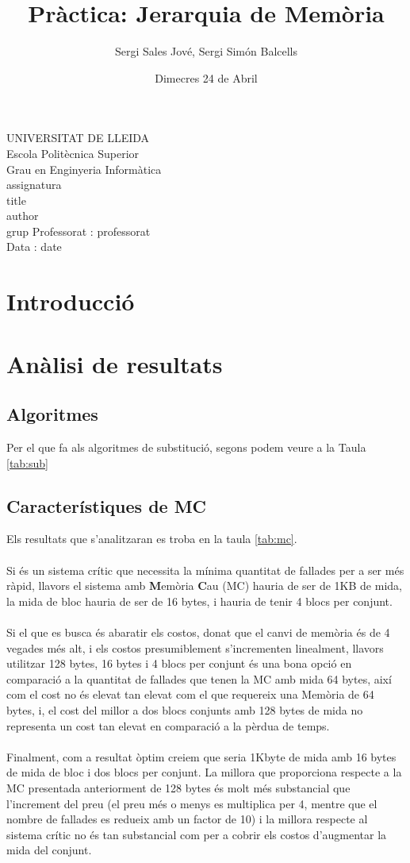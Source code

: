 \documentclass{article}
\title{Pràctica: Jerarquia de Memòria}
\author{Sergi Sales Jové, Sergi Simón Balcells}
\date{Dimecres 24 de Abril}
\renewcommand{\maketitle}{ %
    \begin{titlepage}
        \raggedright{UNIVERSITAT DE LLEIDA \\
            Escola Politècnica Superior \\
            Grau en Enginyeria Informàtica\\
            \1assignatura\\}
            \vspace{5cm}
            \centering\huge{\5title \\}
            \vspace{3cm}
            \large{\6author} \\
            \normalsize{\3grup}
            \vfill
            Professorat : \4professorat \\
            Data : \7date
\end{titlepage}}
\begin{document}
\maketitle
\thispagestyle{empty}

\newpage
{}
\tableofcontents
\newpage
{}
\section{Introducció}
\section{Anàlisi de resultats}
\subsection{Algoritmes}
Per el que fa als algoritmes de substitució, segons podem veure a la Taula \ref{tab:sub}


\subsection{Característiques de MC}
Els resultats que s'analitzaran es troba en la taula \ref{tab:mc}.\\
\\
Si és un sistema crític que necessita la mínima quantitat de fallades per a ser més
ràpid, llavors el sistema amb \textbf{M}emòria \textbf{C}au (MC) hauria de ser de 1KB
de mida, la mida de bloc hauria de ser de 16 bytes, i hauria de tenir 4 blocs per conjunt.\\
\\
Si el que es busca és abaratir els costos, donat que el canvi de memòria és de 4 vegades més
alt, i els costos presumiblement s'incrementen linealment, llavors utilitzar 128 bytes, 16 bytes i
4 blocs per conjunt és una bona opció en comparació a la quantitat de fallades que tenen la MC amb
mida 64 bytes, així com el cost no és elevat tan elevat com el que requereix una Memòria de 64 bytes,
i, el cost del millor a dos blocs conjunts amb 128 bytes de mida no representa un cost tan elevat
en comparació a la pèrdua de temps.\\
\\
Finalment, com a resultat òptim creiem que seria 1Kbyte de mida amb 16 bytes de mida de bloc i
dos blocs per conjunt. La millora que proporciona respecte a la MC presentada anteriorment de 128 bytes
és molt més substancial que l'increment del preu (el preu més o menys es multiplica per 4, mentre que
el nombre de fallades es redueix amb un factor de 10) i la millora respecte al sistema crític no
és tan substancial com per a cobrir els costos d'augmentar la mida del conjunt.
\end{document}
